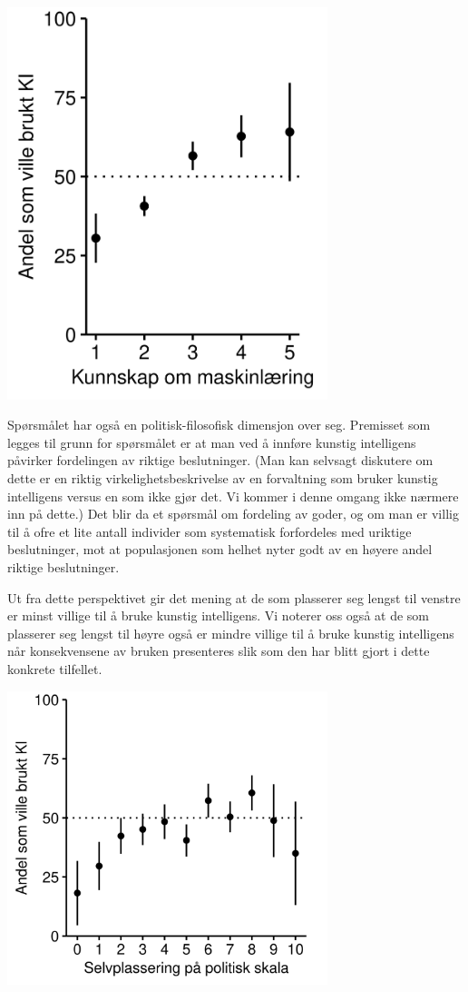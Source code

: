 \documentclass[
]{book}
\begin{document}
\includegraphics[width=0.7\textwidth,height=\textheight]{figs/png/fig_relval_ml_know.png}

Spørsmålet har også en politisk-filosofisk dimensjon over seg.
Premisset som legges til grunn for spørsmålet er at man ved å innføre kunstig intelligens påvirker fordelingen av riktige beslutninger.
(Man kan selvsagt diskutere om dette er en riktig virkelighetsbeskrivelse av en forvaltning som bruker kunstig intelligens versus en som ikke gjør det.
Vi kommer i denne omgang ikke nærmere inn på dette.)
Det blir da et spørsmål om fordeling av goder, og om man er villig til å ofre et lite antall individer som systematisk forfordeles med uriktige beslutninger, mot at populasjonen som helhet nyter godt av en høyere andel riktige beslutninger.

Ut fra dette perspektivet gir det mening at de som plasserer seg lengst til venstre er minst villige til å bruke kunstig intelligens.
Vi noterer oss også at de som plasserer seg lengst til høyre også er mindre villige til å bruke kunstig intelligens når konsekvensene av bruken presenteres slik som den har blitt gjort i dette konkrete tilfellet.

\includegraphics[width=0.7\textwidth,height=\textheight]{figs/png/fig_relval_polscale.png}
\end{document}
